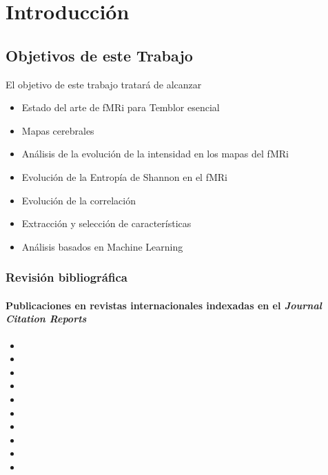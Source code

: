 \chapter{Introducción}

\section{Objetivos de este Trabajo}

El objetivo de este trabajo tratará de alcanzar

\begin{itemize}
\item Estado del arte de fMRi para Temblor esencial
\item Mapas cerebrales
\item Análisis de la evolución de la intensidad en los mapas del fMRi
\item Evolución de la Entropía de Shannon en el fMRi
\item Evolución de la correlación
\item Extracción y selección de características
\item Análisis basados en Machine Learning
\end{itemize}
\subsection*{Revisión bibliográfica}

\subsubsection{Publicaciones en revistas internacionales indexadas en el \textit{Journal Citation Reports}}

\begin{itemize}
\item {}
\item {}
\item {}
\item {}
\item {}
\item {}
\item {}
\item {}
\item {}
\item {}
\end{itemize}
